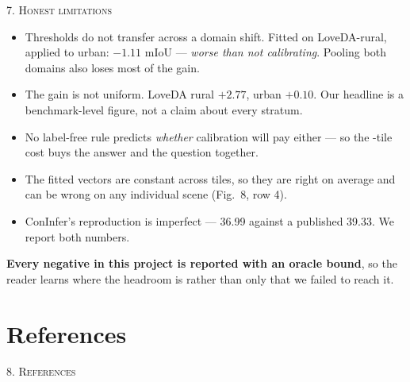 \documentclass[aspectratio=169]{beamer}
\newcommand{\best}[1]{\textcolor{acc}{\textbf{#1}}}
\newcommand{\bad}[1]{\textcolor{warn}{#1}}
\begin{document}
\begin{frame}{\textsc{7. Honest limitations}}
\begin{itemize}
  \item \bad{Thresholds do not transfer across a domain shift.} Fitted on
        LoveDA-rural, applied to urban: \bad{$-1.11$ mIoU} --- \emph{worse than
        not calibrating}. Pooling both domains also loses most of the gain.
  \item \bad{The gain is not uniform.} LoveDA rural $+2.77$, urban $+0.10$. Our
        headline is a benchmark-level figure, not a claim about every stratum.
  \item \bad{No label-free rule predicts \emph{whether} calibration will pay}
        either --- so the \calibTiles{}-tile cost buys the answer and the
        question together.
  \item \bad{The fitted vectors are constant across tiles}, so they are right on
        average and can be wrong on any individual scene (Fig.~8, row 4).
  \item \bad{ConInfer's reproduction is imperfect} --- 36.99 against a published
        39.33. We report both numbers.
\end{itemize}
\vspace{0.4em}
\footnotesize\best{Every negative in this project is reported with an oracle bound},
so the reader learns where the headroom is rather than only that we failed to
reach it.
\end{frame}

\section{References}
\begin{frame}[allowframebreaks]{\textsc{8. References}}
\scriptsize


\end{frame}
\end{document}
